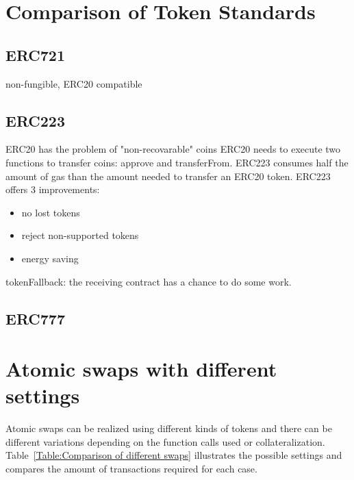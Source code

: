\section{Comparison of Token Standards}
\subsection{ERC721}
non-fungible, ERC20 compatible
\subsection{ERC223}
ERC20 has the problem of "non-recovarable" coins
ERC20 needs to execute two functions to transfer coins: approve and transferFrom. ERC223 consumes half the amount of gas than the amount needed to transfer an ERC20 token.
ERC223 offers 3 improvements:
\begin{itemize}
  \item no lost tokens
  \item reject non-supported tokens
  \item energy saving
\end{itemize}

tokenFallback: the receiving contract has a chance to do some work.
\subsection{ERC777}

\section{Atomic swaps with different settings}
Atomic swaps can be realized using different kinds of tokens and there can be different variations depending on the function calls used or collateralization. Table~\ref{Table:Comparison of different swaps} illustrates the possible settings and compares the amount of transactions required for each case. 

